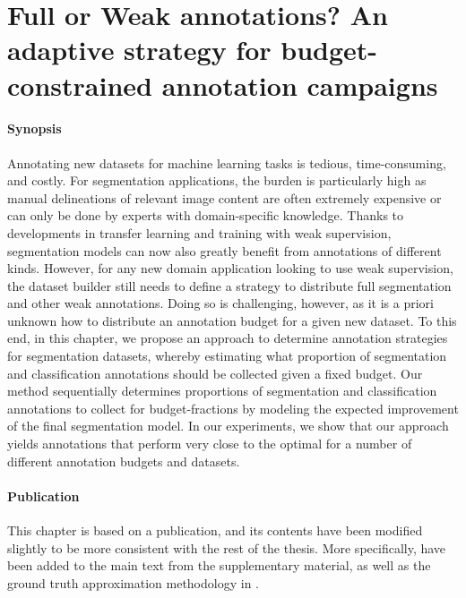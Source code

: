 \graphicspath{{ch3_fullweak/}{Figures/}}

\chapter[Full or Weak annotations?]{Full or Weak annotations? An adaptive strategy for budget-constrained annotation campaigns}
\label{chapter:fullweak}


\subsubsection{Synopsis}Annotating new datasets for machine learning tasks is tedious, time-consuming, and costly. For segmentation applications, the burden is particularly high as manual delineations of relevant image content are often extremely expensive or can only be done by experts with domain-specific knowledge. Thanks to developments in transfer learning and training with weak supervision, segmentation models can now also greatly benefit from annotations of different kinds. However, for any new domain application looking to use weak supervision, the dataset builder still needs to define a strategy to distribute full segmentation and other weak annotations. Doing so is challenging, however, as it is a priori unknown how to distribute an annotation budget for a given new dataset. To this end, in this chapter, we propose an approach to determine annotation strategies for segmentation datasets, whereby estimating what proportion of segmentation and classification annotations should be collected given a fixed budget. Our method sequentially determines proportions of segmentation and classification annotations to collect for budget-fractions by modeling the expected improvement of the final segmentation model. In our experiments, we show that our approach yields annotations that perform very close to the optimal for a number of different annotation budgets and datasets.

\subsubsection{Publication}This chapter is based on a publication, and its contents have been modified slightly to be more consistent with the rest of the thesis. More specifically,  have been added to the main text from the supplementary material, as well as the ground truth approximation methodology in .

